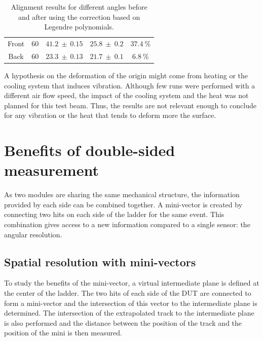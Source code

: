 \begin{table}[!h]
\begin{tabular}{c c c c c}
          \hline %
          Front &      60       & $ 41.2 \ \pm \ 0.15$ & $25.8 \ \pm \ 0.2$  &    $37.4 \ \%$ \tabularnewline
          Back  &      60       & $ 23.3 \ \pm \ 0.13$ & $21.7 \ \pm \ 0.1$  &    $6.8 \ \%$  \tabularnewline
          \hline %
        \end{tabular}
        \caption{Alignment results for different angles before and after using the correction based on Legendre polynomials.}
        \label{tab:correctionOfDeformation}
      \end{table}

      A hypothesis on the deformation of the origin might come from heating or the cooling system that induces vibration.
      Although few runs were performed with a different air flow speed, the impact of the cooling system and the heat was not planned for this test beam.
      Thus, the results are not relevant enough to conclude for any vibration or the heat that tends to deform more the surface.
    
  \section{Benefits of double-sided measurement}
  
  As two modules are sharing the same mechanical structure, the information provided by each side can be combined together.
  A mini-vector is created by connecting two hits on each side of the ladder for the same event.
  This combination gives access to a new information compared to a single sensor: the angular resolution.

    \subsection{Spatial resolution with mini-vectors}

    To study the benefits of the mini-vector, a virtual intermediate plane is defined at the center of the ladder.
    The two hits of each side of the \gls{DUT} are connected to form a mini-vector and the intersection of this vector to the intermediate plane is determined.
    The intersection of the extrapolated track to the intermediate plane is also performed and the distance between the position of the track and the position of the mini is then measured.

